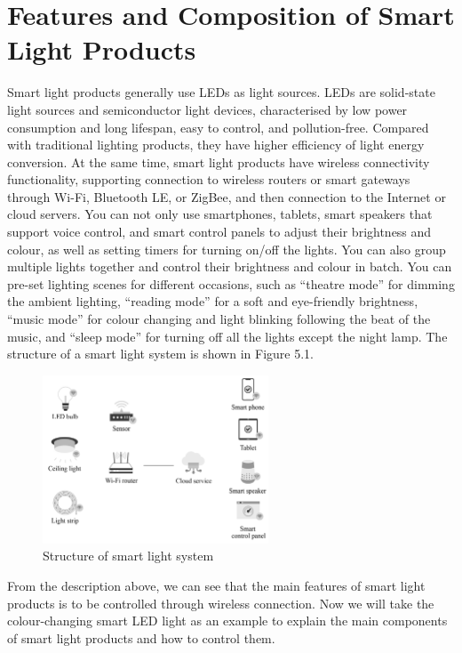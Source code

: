 \documentclass[a4paper,12pt,openany]{book}
\begin{document}
\section{Features and Composition of Smart Light Products}
Smart light products generally use LEDs as light sources. LEDs are solid-state light sources and semiconductor light devices, characterised by low power consumption and long lifespan, easy to control, and pollution-free. Compared with traditional lighting products, they have higher efficiency of light energy conversion. At the same time, smart light products have wireless connectivity functionality, supporting connection to wireless routers or smart gateways through Wi-Fi, Bluetooth LE, or ZigBee, and then connection to the Internet or cloud servers. You can not only use smartphones, tablets, smart speakers that support voice control, and smart control panels to adjust their brightness and colour, as well as setting timers for turning on/off the lights. You can also group multiple lights together and control their brightness and colour in batch. You can pre-set lighting scenes for different occasions, such as “theatre mode” for dimming the ambient lighting, “reading mode” for a soft and eye-friendly brightness, “music mode” for colour changing and light blinking following the beat of the music, and “sleep mode” for turning off all the lights except the night lamp. The structure of a smart light system is shown in Figure 5.1.

\begin{figure}[h!]
    \centering
    \includegraphics[width=0.6\textwidth]{D5Z/5-1}
    \caption{Structure of smart light system}
\end{figure}

From the description above, we can see that the main features of smart light products is to be controlled through wireless connection. Now we will take the colour-changing smart LED light as an example to explain the main components of smart light products and how to control them.
\end{document}
